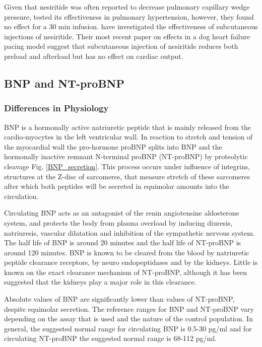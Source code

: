 \documentclass[14pt,a4paper,onecolumn]{extarticle}
\begin{document}
Given that nesiritide was often reported to decrease pulmonary capillary wedge pressure, \citep{Michaels2005} tested its effectiveness in pulmonary hypertension, however, they found no effect for a 30 min infusion. \citep{Chen2006} have investigated the effectiveness of subcutaneous injections of nesiritide. Their most recent paper on effects in a dog heart failure pacing model suggest that subcutaneous injection of nesiritide reduces both preload and afterload but has no effect on cardiac output.



\subsection{BNP and NT-proBNP}

\subsubsection{Differences in Physiology}

BNP is a hormonally active natriuretic peptide that is mainly released from the cardio-myocytes in the left ventricular wall. In reaction to stretch and tension of the myocardial wall the pro-hormone proBNP splits into BNP and the hormonally inactive remnant N-terminal proBNP (NT-proBNP) by proteolytic cleavage Fig. \ref{BNP_secretion}. \citep{Pfister2004} This process occurs under influence of integrins, structures at the Z-disc of sarcomeres, that measure stretch of these sarcomeres \citep{Pyle2004} after which both peptides will be secreted in equimolar amounts into the circulation.



Circulating BNP acts as an antagonist of the renin angiotensine aldosterone system, and protects the body from plasma overload by inducing diuresis, natriuresis, vascular dilatation and inhibition of the sympathetic nervous system. The half life of BNP is around 20 minutes and the half life of NT-proBNP is around 120 minutes. BNP is known to be cleared from the blood by natriuretic peptide clearance receptors, by neuro endopeptidases and by the kidneys. Little is known on the exact clearance mechanism of NT-proBNP, although it has been suggested that the kidneys play a major role in this clearance. \citep{Hall2005}



Absolute values of BNP are significantly lower than values of NT-proBNP, despite equimolar secretion. The reference ranges for BNP and NT-proBNP vary depending on the assay that is used and the nature of the control population. In general, the suggested normal range for circulating BNP is 0.5-30 pg/ml and for circulating NT-proBNP the suggested normal range is 68-112 pg/ml. \citep{Cowie2003}
\end{document}
